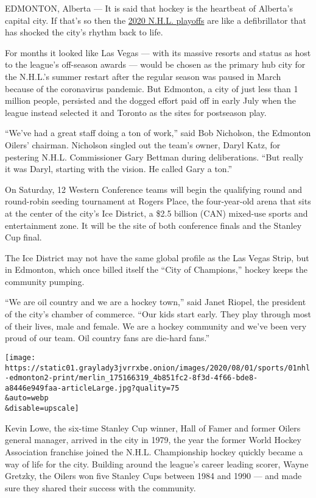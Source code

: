 EDMONTON, Alberta --- It is said that hockey is the heartbeat of
Alberta's capital city. If that's so then the
\href{https://www.nytimes3xbfgragh.onion/2020/07/06/sports/hockey/nhl-playoffs.html}{2020
N.H.L. playoffs} are like a defibrillator that has shocked the city's
rhythm back to life.

For months it looked like Las Vegas --- with its massive resorts and
status as host to the league's off-season awards --- would be chosen as
the primary hub city for the N.H.L.'s summer restart after the regular
season was paused in March because of the coronavirus pandemic. But
Edmonton, a city of just less than 1 million people, persisted and the
dogged effort paid off in early July when the league instead selected it
and Toronto as the sites for postseason play.

``We've had a great staff doing a ton of work,'' said Bob Nicholson, the
Edmonton Oilers' chairman. Nicholson singled out the team's owner, Daryl
Katz, for pestering N.H.L. Commissioner Gary Bettman during
deliberations. ``But really it was Daryl, starting with the vision. He
called Gary a ton.''

On Saturday, 12 Western Conference teams will begin the qualifying round
and round-robin seeding tournament at Rogers Place, the four-year-old
arena that sits at the center of the city's Ice District, a \$2.5
billion (CAN) mixed-use sports and entertainment zone. It will be the
site of both conference finals and the Stanley Cup final.

The Ice District may not have the same global profile as the Las Vegas
Strip, but in Edmonton, which once billed itself the ``City of
Champions,'' hockey keeps the community pumping.

``We are oil country and we are a hockey town,'' said Janet Riopel, the
president of the city's chamber of commerce. ``Our kids start early.
They play through most of their lives, male and female. We are a hockey
community and we've been very proud of our team. Oil country fans are
die-hard fans.''

\texttt{[image: https://static01.graylady3jvrrxbe.onion/images/2020/08/01/sports/01nhl-edmonton2-print/merlin\_175166319\_4b851fc2-8f3d-4f66-bde8-a8446e949faa-articleLarge.jpg?quality=75\\\&auto=webp\\\&disable=upscale]}

Kevin Lowe, the six-time Stanley Cup winner, Hall of Famer and former
Oilers general manager, arrived in the city in 1979, the year the former
World Hockey Association franchise joined the N.H.L. Championship hockey
quickly became a way of life for the city. Building around the league's
career leading scorer, Wayne Gretzky, the Oilers won five Stanley Cups
between 1984 and 1990 --- and made sure they shared their success with
the community.

